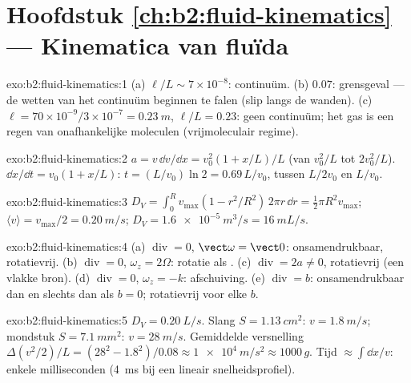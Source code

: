 \section*{Hoofdstuk \ref{ch:b2:fluid-kinematics} --- Kinematica van fluïda}

\begin{solution}{exo:b2:fluid-kinematics:1}
(a) $\ell/L \sim 7 \times 10^{-8}$: continuüm. (b) $0.07$: grensgeval --- de
wetten van het continuüm beginnen te falen (slip langs de wanden). (c)
$\ell = 70 \times 10^{-9}
/3 \times 10^{-7} = \qty{0.23}{m}$,
$\ell/L = 0.23$: geen continuüm; het gas is een regen van onafhankelijke
moleculen (vrijmoleculair regime).
\end{solution}

\begin{solution}{exo:b2:fluid-kinematics:2}
$a = v\,\dd v/\dd x = v_0^2(1 + x/L)/L$ (van $v_0^2/L$ tot $2v_0^2/L$).
$\dd x/\dd t = v_0(1 + x/L)$: $t = (L/v_0)\ln2 = 0.69\,L/v_0$, tussen
$L/2v_0$ en $L/v_0$.
\end{solution}

\begin{solution}{exo:b2:fluid-kinematics:3}
$D_V = \int_0^Rv_{\max}(1 - r^2/R^2)\,2\pi r\,\dd r = \tfrac12\pi R^2v_{\max}$;
$\langle v\rangle = v_{\max}/2 = \qty{0.20}{m/s}$;
$D_V = \qty{1.6e-5}{m^3/s} =
\qty{16}{mL/s}$.
\end{solution}

\begin{solution}{exo:b2:fluid-kinematics:4}
(a) $\operatorname{div} = 0$, $\vect\omega = \vect 0$: onsamendrukbaar,
rotatievrij. (b) $\operatorname{div} = 0$, $\omega_z = 2\Omega$: rotatie als
. (c) $\operatorname{div} = 2a \ne 0$, rotatievrij (een vlakke
bron). (d) $\operatorname{div} = 0$, $\omega_z = -k$: afschuiving. (e)
$\operatorname{div} = b$: onsamendrukbaar dan en slechts dan als $b = 0$;
rotatievrij voor elke $b$.
\end{solution}

\begin{solution}{exo:b2:fluid-kinematics:5}
$D_V = \qty{0.20}{L/s}$. Slang $S = \qty{1.13}{cm^2}$: $v = \qty{1.8}{m/s}$;
mondstuk $S = \qty{7.1}{mm^2}$: $v = \qty{28}{m/s}$. Gemiddelde versnelling
$\Delta(v^2/2)/L
= (28^2 - 1.8^2)/0.08 \approx \qty{1e4}{m/s^2} \approx 1000\,g$.
Tijd $\approx
\int\dd x/v$: enkele milliseconden (\qty{4}{ms} bij een
lineair snelheidsprofiel).
\end{solution}

